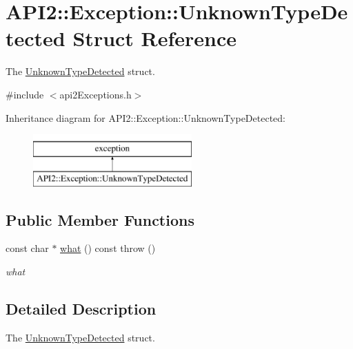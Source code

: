 \hypertarget{struct_a_p_i2_1_1_exception_1_1_unknown_type_detected}{\section{A\-P\-I2\-:\-:Exception\-:\-:Unknown\-Type\-Detected Struct Reference}
\label{struct_a_p_i2_1_1_exception_1_1_unknown_type_detected}
}


The \hyperlink{struct_a_p_i2_1_1_exception_1_1_unknown_type_detected}{Unknown\-Type\-Detected} struct.  




{\ttfamily \#include $<$api2\-Exceptions.\-h$>$}

Inheritance diagram for A\-P\-I2\-:\-:Exception\-:\-:Unknown\-Type\-Detected\-:\begin{figure}[H]
\begin{center}
\leavevmode
\includegraphics[height=2.000000cm]{struct_a_p_i2_1_1_exception_1_1_unknown_type_detected}
\end{center}
\end{figure}
\subsection*{Public Member Functions}
\begin{DoxyCompactItemize}
\item 
const char $\ast$ \hyperlink{struct_a_p_i2_1_1_exception_1_1_unknown_type_detected_ad28dd6902400245b8eb890a0c4952526}{what} () const   throw ()
\begin{DoxyCompactList}\small\item\em what \end{DoxyCompactList}\end{DoxyCompactItemize}


\subsection{Detailed Description}
The \hyperlink{struct_a_p_i2_1_1_exception_1_1_unknown_type_detected}{Unknown\-Type\-Detected} struct. 

